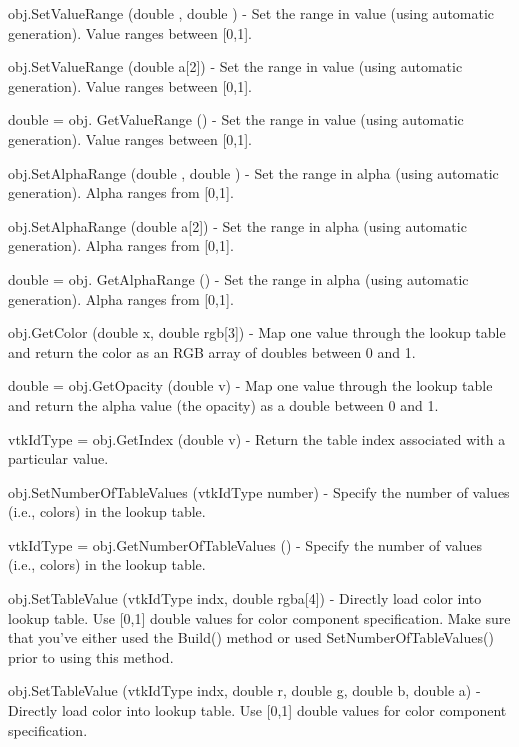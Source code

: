 \begin{DoxyItemize}
\item {\ttfamily obj.\-Set\-Value\-Range (double , double )} -\/ Set the range in value (using automatic generation). Value ranges between \mbox{[}0,1\mbox{]}.  
\item {\ttfamily obj.\-Set\-Value\-Range (double a\mbox{[}2\mbox{]})} -\/ Set the range in value (using automatic generation). Value ranges between \mbox{[}0,1\mbox{]}.  
\item {\ttfamily double = obj. Get\-Value\-Range ()} -\/ Set the range in value (using automatic generation). Value ranges between \mbox{[}0,1\mbox{]}.  
\item {\ttfamily obj.\-Set\-Alpha\-Range (double , double )} -\/ Set the range in alpha (using automatic generation). Alpha ranges from \mbox{[}0,1\mbox{]}.  
\item {\ttfamily obj.\-Set\-Alpha\-Range (double a\mbox{[}2\mbox{]})} -\/ Set the range in alpha (using automatic generation). Alpha ranges from \mbox{[}0,1\mbox{]}.  
\item {\ttfamily double = obj. Get\-Alpha\-Range ()} -\/ Set the range in alpha (using automatic generation). Alpha ranges from \mbox{[}0,1\mbox{]}.  
\item {\ttfamily obj.\-Get\-Color (double x, double rgb\mbox{[}3\mbox{]})} -\/ Map one value through the lookup table and return the color as an R\-G\-B array of doubles between 0 and 1.  
\item {\ttfamily double = obj.\-Get\-Opacity (double v)} -\/ Map one value through the lookup table and return the alpha value (the opacity) as a double between 0 and 1.  
\item {\ttfamily vtk\-Id\-Type = obj.\-Get\-Index (double v)} -\/ Return the table index associated with a particular value.  
\item {\ttfamily obj.\-Set\-Number\-Of\-Table\-Values (vtk\-Id\-Type number)} -\/ Specify the number of values (i.\-e., colors) in the lookup table.  
\item {\ttfamily vtk\-Id\-Type = obj.\-Get\-Number\-Of\-Table\-Values ()} -\/ Specify the number of values (i.\-e., colors) in the lookup table.  
\item {\ttfamily obj.\-Set\-Table\-Value (vtk\-Id\-Type indx, double rgba\mbox{[}4\mbox{]})} -\/ Directly load color into lookup table. Use \mbox{[}0,1\mbox{]} double values for color component specification. Make sure that you've either used the Build() method or used Set\-Number\-Of\-Table\-Values() prior to using this method.  
\item {\ttfamily obj.\-Set\-Table\-Value (vtk\-Id\-Type indx, double r, double g, double b, double a)} -\/ Directly load color into lookup table. Use \mbox{[}0,1\mbox{]} double values for color component specification.  

\end{DoxyItemize}
